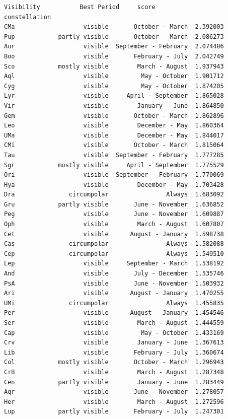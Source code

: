 \documentclass[11pt]{article}
\begin{document}
\begin{tcolorbox}[breakable, size=fbox, boxrule=.5pt, pad at break*=1mm, opacityfill=0]
\begin{Verbatim}[commandchars=\\\{\}]
                   Visibility           Best Period     score
constellation
CMa                   visible       October - March  2.392003
Pup            partly visible       October - March  2.086273
Aur                   visible  September - February  2.074486
Boo                   visible       February - July  2.042749
Sco            mostly visible        March - August  1.937943
Aql                   visible         May - October  1.901712
Cyg                   visible         May - October  1.874205
Lyr                   visible     April - September  1.865028
Vir                   visible        January - June  1.864850
Gem                   visible       October - March  1.862896
Leo                   visible        December - May  1.860364
UMa                   visible        December - May  1.844017
CMi                   visible       October - March  1.815064
Tau                   visible  September - February  1.777285
Sgr            mostly visible     April - September  1.775529
Ori                   visible  September - February  1.770069
Hya                   visible        December - May  1.703428
Dra               circumpolar                Always  1.683092
Gru            partly visible       June - November  1.636852
Peg                   visible       June - November  1.609887
Oph                   visible        March - August  1.607807
Cet                   visible      August - January  1.598738
Cas               circumpolar                Always  1.582088
Cep               circumpolar                Always  1.549510
Lep                   visible     September - March  1.538192
And                   visible       July - December  1.535746
PsA                   visible       June - November  1.503932
Ari                   visible      August - January  1.470255
UMi               circumpolar                Always  1.455835
Per                   visible      August - January  1.454546
Ser                   visible        March - August  1.444559
Cap                   visible         May - October  1.433169
Crv                   visible        January - June  1.367613
Lib                   visible       February - July  1.360674
Col            mostly visible       October - March  1.296943
CrB                   visible        March - August  1.287348
Cen            partly visible        January - June  1.283449
Aqr                   visible       June - November  1.278057
Her                   visible        March - August  1.272596
Lup            partly visible       February - July  1.247301
\end{Verbatim}
\end{tcolorbox}
        

    
    
    
\end{document}
